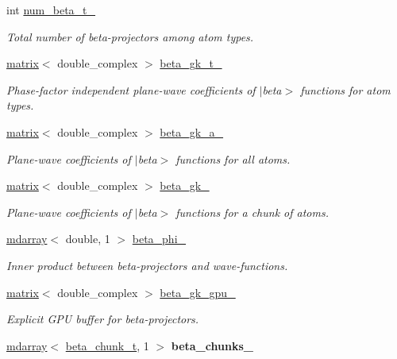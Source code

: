 \begin{DoxyCompactItemize}
\item 
int \hyperlink{classsirius_1_1_beta__projectors_a176c878a0f274fb8090ed0f7ec45c4e9}{num\+\_\+beta\+\_\+t\+\_\+}
\begin{DoxyCompactList}\small\item\em Total number of beta-\/projectors among atom types. \end{DoxyCompactList}\item 
\hyperlink{classsddk_1_1mdarray}{matrix}$<$ double\+\_\+complex $>$ \hyperlink{classsirius_1_1_beta__projectors_ae6909d7464080150d4bc804b23c87c82}{beta\+\_\+gk\+\_\+t\+\_\+}
\begin{DoxyCompactList}\small\item\em Phase-\/factor independent plane-\/wave coefficients of $\vert$beta$>$ functions for atom types. \end{DoxyCompactList}\item 
\hyperlink{classsddk_1_1mdarray}{matrix}$<$ double\+\_\+complex $>$ \hyperlink{classsirius_1_1_beta__projectors_a9503b0e8abcbc76361db077f9cd69927}{beta\+\_\+gk\+\_\+a\+\_\+}
\begin{DoxyCompactList}\small\item\em Plane-\/wave coefficients of $\vert$beta$>$ functions for all atoms. \end{DoxyCompactList}\item 
\hyperlink{classsddk_1_1mdarray}{matrix}$<$ double\+\_\+complex $>$ \hyperlink{classsirius_1_1_beta__projectors_a9fff826234ee6a2fb6104bc6edcdb6e3}{beta\+\_\+gk\+\_\+}
\begin{DoxyCompactList}\small\item\em Plane-\/wave coefficients of $\vert$beta$>$ functions for a chunk of atoms. \end{DoxyCompactList}\item 
\hyperlink{classsddk_1_1mdarray}{mdarray}$<$ double, 1 $>$ \hyperlink{classsirius_1_1_beta__projectors_a47cc90705d37315cb5b319249693e091}{beta\+\_\+phi\+\_\+}
\begin{DoxyCompactList}\small\item\em Inner product between beta-\/projectors and wave-\/functions. \end{DoxyCompactList}\item 
\hyperlink{classsddk_1_1mdarray}{matrix}$<$ double\+\_\+complex $>$ \hyperlink{classsirius_1_1_beta__projectors_aaf7e217e59a9d8388d6b9921a9264775}{beta\+\_\+gk\+\_\+gpu\+\_\+}
\begin{DoxyCompactList}\small\item\em Explicit G\+P\+U buffer for beta-\/projectors. \end{DoxyCompactList}\item 
\hypertarget{classsirius_1_1_beta__projectors_afe773b0501d04358080ed6b66957f08b}{}\hyperlink{classsddk_1_1mdarray}{mdarray}$<$ \hyperlink{structsirius_1_1_beta__projectors_1_1beta__chunk__t}{beta\+\_\+chunk\+\_\+t}, 1 $>$ {\bfseries beta\+\_\+chunks\+\_\+}\label{classsirius_1_1_beta__projectors_afe773b0501d04358080ed6b66957f08b}


\end{DoxyCompactItemize}

